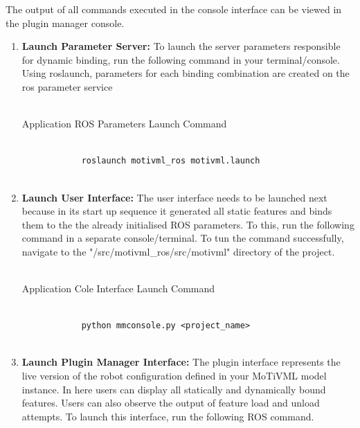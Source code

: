 \documentclass{article}
\newenvironment{longlisting}{\captionsetup{type=listing}}{}
\begin{document}
The output of all commands executed in the console interface can be viewed in the plugin manager console.
\begin{enumerate}
	\item \textbf{Launch Parameter Server: } To launch the server parameters responsible for dynamic binding, run the following command in your terminal/console. Using roslaunch, parameters for each binding combination are created on the ros parameter service\\\\
	
	\begin{longlisting}
		\caption{Application ROS Parameters Launch Command}
		\begin{verbatim}
			
			roslaunch motivml_ros motivml.launch
			
		\end{verbatim}
		\label{paramlaunch}
	\end{longlisting}
	
	
	\item \textbf{Launch User Interface: } The user interface needs to be launched next because in its start up sequence it generated all static features and binds them to the the already initialised ROS parameters. To this, run the following command in a separate console/terminal. To tun the command successfully, navigate to the "/src/motivml\_ros/src/motivml" directory of the project.\\\\
	
	\begin{longlisting}
		\caption{Application Cole Interface Launch Command}
		\begin{verbatim}
			
			python mmconsole.py <project_name>
			
		\end{verbatim}
		\label{ui}
	\end{longlisting}

	\item \textbf{Launch Plugin Manager Interface: } The plugin interface represents the live version of the robot configuration defined in your MoTiVML model instance. In here users can display all statically and dynamically bound features. Users can also observe the output of feature load and unload attempts. To launch this interface, run the following ROS command. \\\\
	

\end{enumerate}
\end{document}
